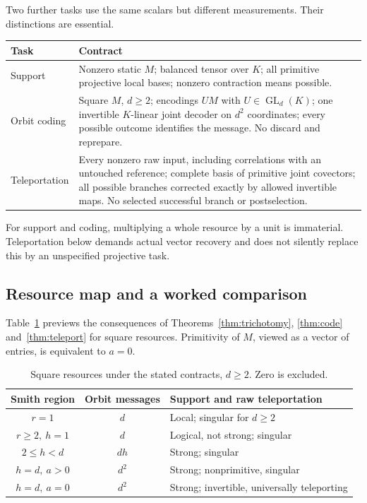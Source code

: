 \documentclass[11pt]{article}
\theoremstyle{definition}\newtheorem{definition}[theorem]{Definition}
\theoremstyle{remark}\newtheorem{remark}[theorem]{Remark}
\DeclareMathOperator{\GL}{GL}
\begin{document}
Two further tasks use the same scalars but different measurements. Their distinctions are essential.
\begin{center}\small
\begin{tabular}{p{.15\linewidth}p{.74\linewidth}}
\toprule
Task & Contract \\\midrule
Support & Nonzero static $M$; balanced tensor over $K$; all primitive projective local bases; nonzero contraction means possible. \\
Orbit coding & Square $M$, $d\geq2$; encodings $UM$ with $U\in\GL_d(K)$; one invertible $K$-linear joint decoder on $d^2$ coordinates; every possible outcome identifies the message. No discard and reprepare. \\
Teleportation & Every nonzero raw input, including correlations with an untouched reference; complete basis of primitive joint covectors; all possible branches corrected exactly by allowed invertible maps. No selected successful branch or postselection. \\\bottomrule
\end{tabular}
\end{center}
For support and coding, multiplying a whole resource by a unit is immaterial. Teleportation below demands actual vector recovery and does not silently replace this by an unspecified projective task.



\subsection{Resource map and a worked comparison}
Table~\ref{tab:map} previews the consequences of Theorems~\ref{thm:trichotomy}, \ref{thm:code} and~\ref{thm:teleport} for square resources. Primitivity of $M$, viewed as a vector of entries, is equivalent to $a=0$.
\begin{table}[ht]\centering\small
\begin{tabular}{ccl}
\toprule
Smith region & Orbit messages & Support and raw teleportation\\\midrule
$r=1$ & $d$ & Local; singular for $d\geq2$\\
$r\geq2,\ h=1$ & $d$ & Logical, not strong; singular\\
$2\leq h<d$ & $dh$ & Strong; singular\\
$h=d,\ a>0$ & $d^2$ & Strong; nonprimitive, singular\\
$h=d,\ a=0$ & $d^2$ & Strong; invertible, universally teleporting\\\bottomrule
\end{tabular}
\caption{Square resources under the stated contracts, $d\geq2$. Zero is excluded.}\label{tab:map}
\end{table}
\end{document}
